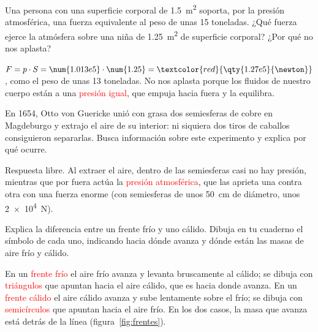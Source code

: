 \begin{exercise}
    Una persona con una superficie corporal de \qty{1.5}{\square\m} soporta, por la presión atmosférica, una fuerza equivalente al peso de unas 15 toneladas. ¿Qué fuerza ejerce la atmósfera sobre una niña de \qty{1.25}{\square\m} de superficie corporal? ¿Por qué no nos aplasta?
    \begin{solu}
        \(F = p \cdot S = \num{1.013e5} \cdot \num{1.25} = \textcolor{red}{\qty{1.27e5}{\newton}}\), como el peso de unas 13 toneladas.
        No nos aplasta porque los fluidos de nuestro cuerpo están a una \textcolor{red}{presión igual}, que empuja hacia fuera y la equilibra.
    \end{solu}
\end{exercise}

\begin{exercise}
    En 1654, Otto von Guericke unió con grasa dos semiesferas de cobre en Magdeburgo y extrajo el aire de su interior: ni siquiera dos tiros de caballos consiguieron separarlas. Busca información sobre este experimento y explica por qué ocurre.
    \begin{solu}
        Respuesta libre. Al extraer el aire, dentro de las semiesferas casi no hay presión, mientras que por fuera actúa la \textcolor{red}{presión atmosférica}, que las aprieta una contra otra con una fuerza enorme (con semiesferas de unos \qty{50}{\cm} de diámetro, unos \qty{2e4}{\newton}).
    \end{solu}
\end{exercise}

\begin{exercise}
    Explica la diferencia entre un frente frío y uno cálido. Dibuja en tu cuaderno el símbolo de cada uno, indicando hacia dónde avanza y dónde están las masas de aire frío y cálido.
    \begin{solu}
        En un \textcolor{red}{frente frío} el aire frío avanza y levanta bruscamente al cálido; se dibuja con \textcolor{red}{triángulos} que apuntan hacia el aire cálido, que es hacia donde avanza. En un \textcolor{red}{frente cálido} el aire cálido avanza y sube lentamente sobre el frío; se dibuja con \textcolor{red}{semicírculos} que apuntan hacia el aire frío. En los dos casos, la masa que avanza está detrás de la línea (figura~\ref{fig:frentes}).
    \end{solu}
\end{exercise}

